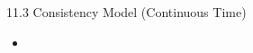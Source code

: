 \begin{frame}{11.3 Consistency Model (Continuous Time)}
    \begin{itemize}
        \item
    \end{itemize}
\end{frame}
